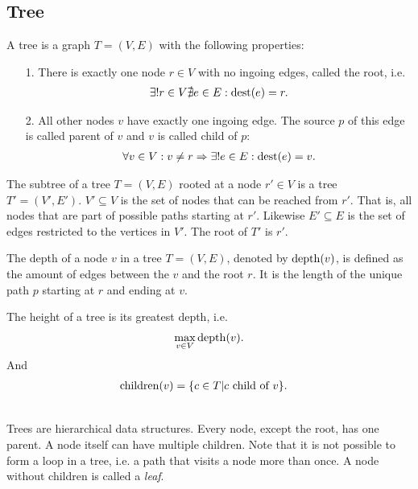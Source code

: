 \subsection{Tree}
	\begin{mydef}\label{tree}
		A \textnormal{tree} is a graph $T = (V, E)$ with the following properties:
		\begin{itemize}
			\item[1.] There is exactly one node $r \in V$ with no ingoing edges, called the \textnormal{root}, i.e.
				\begin{align*}
					\exists! r \in V \nexists e \in E : \operatorname{dest}(e) = r.
				\end{align*}
			\item[2.] All other nodes $v$ have exactly one ingoing edge. The source $p$ of this edge is called \textnormal{parent} of $v$ and
				$v$ is called \textnormal{child} of $p$:
				\begin{align*}
					\forall v \in V : v \neq r \Rightarrow \exists! e \in E : \operatorname{dest}(e) = v.
				\end{align*}
		\end{itemize}
	\end{mydef}
	\begin{mydef}\label{subTree}
		The \textnormal{subtree} of a tree $T = (V, E)$ rooted at a node $r' \in V$ is a tree $T' = (V', E')$. $V' \subseteq V$ is the set
		of nodes that can be reached from $r'$. That is, all nodes that are part of possible paths starting at $r'$.
		Likewise $E' \subseteq E$ is the set of edges restricted to the vertices in $V'$. The root of $T'$ is $r'$.
	\end{mydef}
	\begin{mydef}\label{treeDepth}
		The \textnormal{depth} of a node $v$ in a tree $T = (V, E)$, denoted by $\operatorname{depth}(v)$, is defined as the amount of
		edges between the $v$ and the root $r$. It is the length of the unique path $p$ starting at $r$ and ending at $v$.
		
		The \textnormal{height} of a tree is its greatest depth, i.e.
		\begin{align*}
			\max_{v \in V} \operatorname{depth}(v).
		\end{align*}
		And
		\begin{align*}
			\operatorname{children}(v)	&= \{c \in T | c \text{ child of } v\}.
		\end{align*}
	\end{mydef}\quad\\
	Trees are hierarchical data structures. Every node, except the root, has one parent. A node itself can have multiple children.
	Note that it is not possible to form a loop in a tree, i.e. a path that visits a node more than once. A node without
	children is called a \textit{leaf}.

